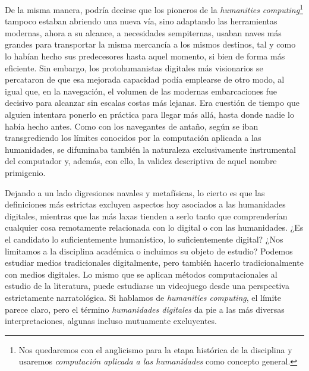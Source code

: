 De la misma manera, podría decirse que los pioneros de la \textit{humanities computing}\footnote{Nos quedaremos con el anglicismo para la etapa histórica de la disciplina y usaremos \textit{computación aplicada a las humanidades} como concepto general.} tampoco estaban abriendo una nueva vía, sino adaptando las herramientas modernas, ahora a su alcance, a necesidades sempiternas, usaban naves más grandes para transportar la misma mercancía a los mismos destinos, tal y como lo habían hecho sus predecesores hasta aquel momento, si bien de forma más eficiente. Sin embargo, los protohumanistas digitales más visionarios se percataron de que esa mejorada capacidad podía emplearse de otro modo, al igual que, en la navegación, el volumen de las modernas embarcaciones fue decisivo para alcanzar  sin escalas costas más lejanas. Era cuestión de tiempo que alguien intentara ponerlo en práctica para llegar más allá, hasta donde nadie lo había hecho antes. Como con los navegantes de antaño, según se iban transgrediendo los límites conocidos por la computación aplicada a las humanidades, se difuminaba también la naturaleza exclusivamente instrumental del computador y, además, con ello, la validez descriptiva de aquel nombre primigenio.

Dejando a un lado digresiones navales y metafísicas, lo cierto es que las definiciones más estrictas excluyen aspectos hoy asociados a las humanidades digitales, mientras que las más laxas tienden a serlo tanto que comprenderían cualquier cosa remotamente relacionada con lo digital o con las humanidades. ¿Es el candidato lo suficientemente humanístico, lo suficientemente digital? ¿Nos limitamos a la disciplina académica o incluimos su objeto de estudio? Podemos estudiar medios tradicionales digitalmente, pero también hacerlo tradicionalmente con medios digitales. Lo mismo que se aplican métodos computacionales al estudio de la literatura, puede estudiarse un videojuego desde una perspectiva estrictamente narratológica. Si hablamos de \textit{humanities computing}, el límite parece claro, pero el término \textit{humanidades digitales} da pie a las más diversas interpretaciones, algunas incluso mutuamente excluyentes.

